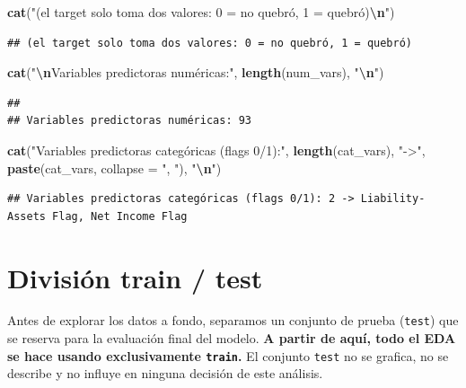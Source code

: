 \documentclass[
]{book}
\newenvironment{Shaded}{\begin{snugshade}}{\end{snugshade}}
\newcommand{\AttributeTok}[1]{\textcolor[rgb]{0.13,0.29,0.53}{#1}}
\newcommand{\FunctionTok}[1]{\textcolor[rgb]{0.13,0.29,0.53}{\textbf{#1}}}
\newcommand{\NormalTok}[1]{#1}
\newcommand{\SpecialCharTok}[1]{\textcolor[rgb]{0.81,0.36,0.00}{\textbf{#1}}}
\newcommand{\StringTok}[1]{\textcolor[rgb]{0.31,0.60,0.02}{#1}}
\begin{document}
\begin{Shaded}
\begin{Highlighting}[]
\FunctionTok{cat}\NormalTok{(}\StringTok{"(el target solo toma dos valores: 0 = no quebró, 1 = quebró)}\SpecialCharTok{\textbackslash{}n}\StringTok{"}\NormalTok{)}
\end{Highlighting}
\end{Shaded}

\begin{verbatim}
## (el target solo toma dos valores: 0 = no quebró, 1 = quebró)
\end{verbatim}

\begin{Shaded}
\begin{Highlighting}[]
\FunctionTok{cat}\NormalTok{(}\StringTok{"}\SpecialCharTok{\textbackslash{}n}\StringTok{Variables predictoras numéricas:"}\NormalTok{, }\FunctionTok{length}\NormalTok{(num\_vars), }\StringTok{"}\SpecialCharTok{\textbackslash{}n}\StringTok{"}\NormalTok{)}
\end{Highlighting}
\end{Shaded}

\begin{verbatim}
## 
## Variables predictoras numéricas: 93
\end{verbatim}

\begin{Shaded}
\begin{Highlighting}[]
\FunctionTok{cat}\NormalTok{(}\StringTok{"Variables predictoras categóricas (flags 0/1):"}\NormalTok{, }\FunctionTok{length}\NormalTok{(cat\_vars),}
    \StringTok{"{-}\textgreater{}"}\NormalTok{, }\FunctionTok{paste}\NormalTok{(cat\_vars, }\AttributeTok{collapse =} \StringTok{", "}\NormalTok{), }\StringTok{"}\SpecialCharTok{\textbackslash{}n}\StringTok{"}\NormalTok{)}
\end{Highlighting}
\end{Shaded}

\begin{verbatim}
## Variables predictoras categóricas (flags 0/1): 2 -> Liability-Assets Flag, Net Income Flag
\end{verbatim}

\section{División train / test}\label{divisiuxf3n-train-test}

Antes de explorar los datos a fondo, separamos un conjunto de prueba (\texttt{test}) que se
reserva para la evaluación final del modelo. \textbf{A partir de aquí, todo el EDA se hace
usando exclusivamente \texttt{train}.} El conjunto \texttt{test} no se grafica, no se describe y no
influye en ninguna decisión de este análisis.
\end{document}
